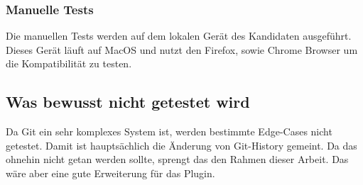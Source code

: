 \subsubsection{Manuelle Tests}
Die manuellen Tests werden auf dem lokalen Gerät des Kandidaten ausgeführt. Dieses Gerät läuft auf MacOS und nutzt
den Firefox, sowie Chrome Browser um die Kompatibilität zu testen.

\subsection{Was bewusst nicht getestet wird}
Da Git ein sehr komplexes System ist, werden bestimmte Edge-Cases nicht getestet. Damit ist hauptsächlich
die Änderung von Git-History gemeint. Da das ohnehin nicht getan werden sollte, sprengt das den Rahmen
dieser Arbeit. Das wäre aber eine gute Erweiterung für das Plugin.
